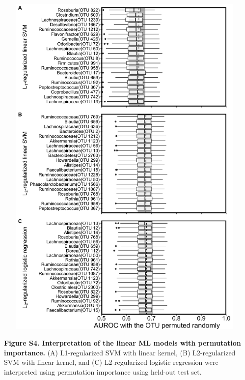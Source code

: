 \documentclass[11pt,]{article}
\begin{document}
\newpage

\includegraphics[height=17.5cm, width=13cm]{Figure_S4.png}

\textbf{Figure S4. Interpretation of the linear ML models with
permutation importance.} (A) L1-regularized SVM with linear kernel, (B)
L2-regularized SVM with linear kernel, and (C) L2-regularized logistic
regression were interpreted using permutation importance using held-out
test set.

\newpage
\end{document}

